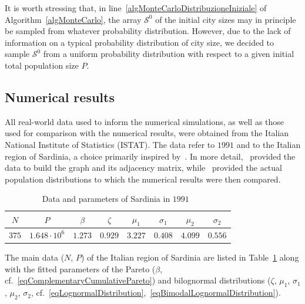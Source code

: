 \documentclass[a4paper]{article}
\begin{document}
It is worth stressing that, in line~\ref{algMonteCarloDistribuzioneIniziale} of Algorithm~\ref{algMonteCarlo}, the array $\mathcal{S}^0$ of the initial city sizes may in principle be sampled from whatever probability distribution. However, due to the lack of information on a typical probability distribution of city size, we decided to sample $\mathcal{S}^0$ from a uniform probability distribution with respect to a given initial total population size $P$.
    
\subsection{Numerical results}
\label{secNumericalResults}
%
All real-world data used to inform the numerical simulations, as well as those used for comparison with the numerical results, were obtained from the Italian National Institute of Statistics (ISTAT). The data refer to $1991$ and to the Italian region of Sardinia, a choice primarily inspired by~\cite{DeMontis2007}. In more detail,~\cite{ISTATPendolarismo1991} provided the data to build the graph and its adjacency matrix, while~\cite{ISTATCensimento1991} provided the actual population distributions to which the numerical results were then compared.

\begin{table}[!t]
\centering
\caption{Data and parameters of Sardinia in $1991$~\cite{ISTATCensimento1991,ISTATPendolarismo1991}}
\begin{tabular}{cccccccc}
    \toprule
    $N$ & $P$ & $\beta$ & $\zeta$ & $\mu_1$ & $\sigma_1$ & $\mu_2$ & $\sigma_2$ \\
    \midrule
    $375$ & $1.648\cdot 10^6$ & $1.273$ & $0.929$ & $3.227$ & $0.408$ & $4.099$ & $0.556$ \\
    \bottomrule
    \end{tabular}
\label{tabSardiniaDataParameters}
\end{table}

The main data ($N$, $P$) of the Italian region of Sardinia are listed in Table~\ref{tabSardiniaDataParameters} along with the fitted parameters of the Pareto ($\beta$, cf.~\eqref{eqComplementaryCumulativePareto}) and bilognormal distributions ($\zeta$, $\mu_1$, $\sigma_1$, $\mu_2$, $\sigma_2$, cf.~\eqref{eqLognormalDistribution},~\eqref{eqBimodalLognormalDistribution}).
                        
\end{document}
